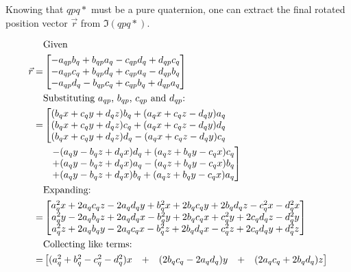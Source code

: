 \documentclass[12pt, a4paper]{article}
\begin{document}
Knowing that $qpq*$ must be a pure quaternion, one can extract the final rotated
position vector $\vec{r}$ from $\Im(qpq*)$.

\begin{align*}
    &\text{Given} \\
    \vec{r} = &\begin{bmatrix}
        - a_{qp}b_q + b_{qp}a_q - c_{qp}d_q + d_{qp}c_q \\
        - a_{qp}c_q + b_{qp}d_q + c_{qp}a_q - d_{qp}b_q \\
        - a_{qp}d_q - b_{qp}c_q + c_{qp}b_q + d_{qp}a_q
    \end{bmatrix} \\
    &\text{Substituting $a_{qp}$, $b_{qp}$, $c_{qp}$ and $d_{qp}$:} \\
    =&\left[\begin{matrix}
        (b_qx + c_qy + d_qz)b_q + (a_qx + c_qz - d_qy)a_q \\
        (b_qx + c_qy + d_qz)c_q + (a_qx + c_qz - d_qy)d_q \\
        (b_qx + c_qy + d_qz)d_q - (a_qx + c_qz - d_qy)c_q
    \end{matrix}\right.\\
    &\hspace{0.24cm}
    \left.\begin{matrix}
        - (a_qy - b_qz + d_qx)d_q + (a_qz + b_qy - c_qx )c_q \\
        + (a_qy - b_qz + d_qx)a_q - (a_qz + b_qy - c_qx )b_q \\
        + (a_qy - b_qz + d_qx)b_q + (a_qz + b_qy - c_qx )a_q
    \end{matrix}\right] \\
    &\text{Expanding:} \\
    = &\begin{bmatrix}
        a_q^2 x + 2 a_q c_q z - 2 a_q d_q y + b_q^2 x + 2 b_q c_q y + 2 b_q d_q z - c_q^2 x - d_q^2 x \\
        a_q^2 y - 2 a_q b_q z + 2 a_q d_q x - b_q^2 y + 2 b_q c_q x + c_q^2 y + 2 c_q d_q z - d_q^2 y \\
        a_q^2 z + 2 a_q b_q y - 2 a_q c_q x - b_q^2 z + 2 b_q d_q x - c_q^2 z + 2 c_q d_q y + d_q^2 z
    \end{bmatrix} \\
    &\text{Collecting like terms:} \\
    = &\begin{bmatrix}
        (a_q^2 + b_q^2 - c_q^2 - d_q^2)x &+& (2 b_q c_q - 2 a_q d_q)y &+& (2 a_q c_q + 2 b_q d_q)z \\

\end{bmatrix}
\end{align*}
\end{document}
